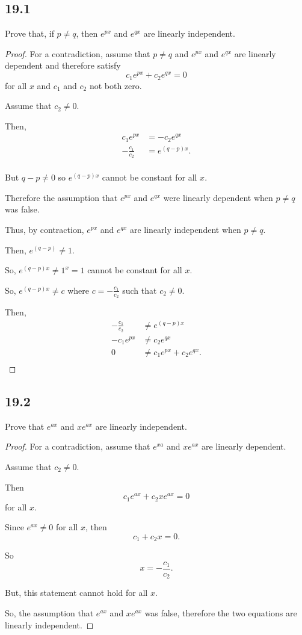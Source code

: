 \documentclass[../hw6]{subfiles}
\begin{document}
\subsection*{19.1}
Prove that, if $p\neq q$, then $e^{px}$ and $e^{qx}$ are linearly independent.

\begin{proof}
For a contradiction, assume that $p\neq q$ and $e^{px}$ and $e^{qx}$ are linearly dependent and therefore satisfy
\[c_1e^{px}+c_2e^{qx}=0\tag{*}\]
for all $x$ and $c_1$ and $c_2$ not both zero.

Assume that $c_2\neq 0$.

Then,
\begin{align*}
    c_1e^{px}&=-c_2e^{qx}\\
    -\frac{c_1}{c_2}&=e^{(q-p)x}.\\
\end{align*}

But $q-p\neq0$ so $e^{(q-p)x}$ cannot be constant for all $x$.

Therefore the assumption that $e^{px}$ and $e^{qx}$ were linearly dependent when $p\neq q$ was false.

Thus, by contraction, $e^{px}$ and $e^{qx}$ are linearly independent when $p\neq q$.


Then, $e^{(q-p)}\neq1$. 

So, $e^{(q-p)x}\neq 1^x = 1$ cannot be constant for all $x$.

So, $e^{(q-p)x}\neq c$ where $c=-\frac{c_1}{c_2}$ such that $c_2\neq0$.

Then, 
\begin{align*}
    -\frac{c_1}{c_2}&\neq e^{(q-p)x}\\
    -c_1e^{px}&\neq c_2e^{qx}\\
    0&\neq c_1e^{px}+c_2e^{qx}.\\
\end{align*}


\end{proof}

\subsection*{19.2}

Prove that $e^{ax}$ and $xe^{ax}$ are linearly independent.

\begin{proof}
    For a contradiction, assume that $e^{xa}$ and $xe^{ax}$ are linearly dependent.
    
    Assume that $c_2\neq0$.

    Then \[c_1e^{ax}+c_2xe^{ax}=0\] for all $x$.

    Since $e^{ax}\neq0$ for all $x$, then \[c_1+c_2x=0.\] 

    So \[x=-\frac{c_1}{c_2}.\]

    But, this statement cannot hold for all $x$.

    So, the assumption that $e^{ax}$ and $xe^{ax}$ was false, therefore the two equations are linearly independent.
\end{proof}
\end{document}
